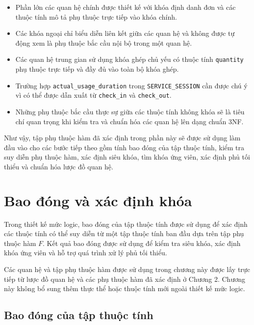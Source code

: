 \begin{itemize}
\item Phần lớn các quan hệ chính được thiết kế với khóa định danh đơn và các thuộc tính mô tả phụ thuộc trực tiếp vào khóa chính.

\item Các khóa ngoại chỉ biểu diễn liên kết giữa các quan hệ và không được tự động xem là phụ thuộc bắc cầu nội bộ trong một quan hệ.

\item Các quan hệ trung gian sử dụng khóa ghép chủ yếu có thuộc tính \texttt{quantity} phụ thuộc trực tiếp và đầy đủ vào toàn bộ khóa ghép.

\item Trường hợp \texttt{actual\_usage\_duration} trong \texttt{SERVICE\_SESSION} cần được chú ý vì có thể được dẫn xuất từ \texttt{check\_in} và \texttt{check\_out}.

\item Những phụ thuộc bắc cầu thực sự giữa các thuộc tính không khóa sẽ là tiêu chí quan trọng khi kiểm tra và chuẩn hóa các quan hệ lên dạng chuẩn 3NF.

\end{itemize}

Như vậy, tập phụ thuộc hàm đã xác định trong phần này sẽ được sử dụng làm đầu vào cho các bước tiếp theo gồm tính bao đóng của tập thuộc tính, kiểm tra suy diễn phụ thuộc hàm, xác định siêu khóa, tìm khóa ứng viên, xác định phủ tối thiểu và chuẩn hóa lược đồ quan hệ.


\section{Bao đóng và xác định khóa}

Trong thiết kế mức logic, bao đóng của tập thuộc tính được sử dụng để xác định
các thuộc tính có thể suy diễn từ một tập thuộc tính ban đầu dựa trên tập
phụ thuộc hàm $F$. Kết quả bao đóng được sử dụng để kiểm tra siêu khóa,
xác định khóa ứng viên và hỗ trợ quá trình xử lý phủ tối thiểu.

Các quan hệ và tập phụ thuộc hàm được sử dụng trong chương này được lấy trực
tiếp từ lược đồ quan hệ và các phụ thuộc hàm đã xác định ở Chương 2. Chương
này không bổ sung thêm thực thể hoặc thuộc tính mới ngoài thiết kế mức logic.

\subsection{Bao đóng của tập thuộc tính}

